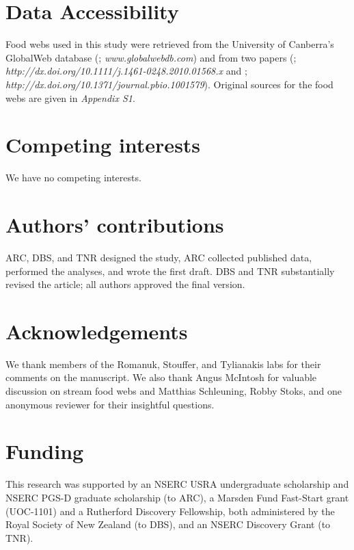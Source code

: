 \documentclass[12pt]{article}
\begin{document}
\section*{Data Accessibility}

  Food webs used in this study were retrieved from the University of Canberra's 
  GlobalWeb database (\cite{GlobalWeb}; \emph{www.globalwebdb.com}) and from
  two papers (\cite{Riede2011}; \emph{http://dx.doi.org/10.1111/j.1461-0248.2010.01568.x}
  and \cite{Dunne2013}; \emph{http://dx.doi.org/10.1371/journal.pbio.1001579}). Original sources for the
  food webs are given in \emph{Appendix S1}. 

\section*{Competing interests}
  
  We have no competing interests.

\section*{Authors' contributions}
  
  ARC, DBS, and TNR designed the study, ARC collected
  published data, performed the analyses, and wrote the
  first draft. DBS and TNR substantially revised the article;
  all authors approved the final version.


\section*{Acknowledgements}
  
  We thank members of the Romanuk, Stouffer, and Tylianakis labs for their comments on
  the manuscript. We also thank Angus McIntosh for valuable discussion on stream food webs and Matthias Schleuning, Robby Stoks, and one anonymous reviewer for their insightful questions.

\section*{Funding}
  This research was supported by an NSERC USRA undergraduate scholarship and NSERC PGS-D 
  graduate scholarship (to ARC), a Marsden Fund Fast-Start grant (UOC-1101) and a 
  Rutherford Discovery Fellowship, both administered by the Royal Society of New Zealand 
  (to DBS), and an NSERC Discovery Grant (to TNR).


\newpage


\end{document}
